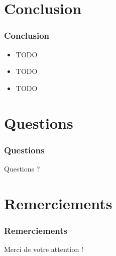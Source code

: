 \documentclass{beamer}
\begin{document}
\section{Conclusion}
\begin{frame}
 \frametitle{Conclusion}
 \begin{itemize}
  \item TODO
  \item TODO
  \item TODO
 \end{itemize}
\end{frame}


\section*{Questions}
\begin{frame}
\frametitle{Questions}
Questions ?
\end{frame}

\section*{Remerciements}
\begin{frame}
 \frametitle{Remerciements}
 Merci de votre attention !
\end{frame}
\end{document}
